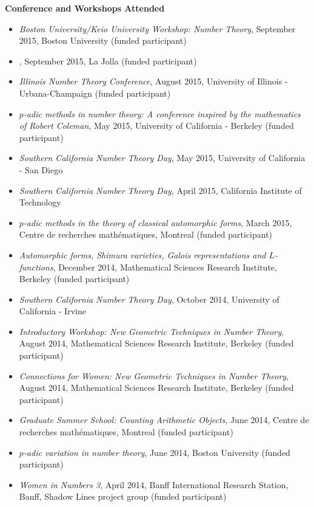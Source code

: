 \documentclass[10pt]{article}
\theoremstyle{plain} \numberwithin{equation}{section}
\theoremstyle{definition}
\begin{document}
\bigskip

{\large\textbf{Conference and Workshops Attended}}

\begin{itemize} 
\item[] \textit{Boston University/Keio University Workshop: Number Theory}, September 2015, Boston University (funded participant)
\item[] , September 2015, La Jolla (funded participant)
\item[] \textit{Illinois Number Theory Conference}, August 2015, University of Illinois - Urbana-Champaign (funded participant)
\item[] \textit{$p$-adic methods in number theory: A conference inspired by the mathematics of Robert Coleman}, May 2015, University of California - Berkeley (funded participant)
\item[] \textit{Southern California Number Theory Day}, May 2015, University of California - San Diego
\item[] \textit{Southern California Number Theory Day}, April 2015, California Institute of Technology
\item[] \textit{$p$-adic methods in the theory of classical automorphic forms}, March 2015, Centre de recherches math\'ematiques, Montreal (funded participant)
\item[] \textit{Automorphic forms, Shimura varieties, Galois representations and $L$-functions}, December 2014, Mathematical Sciences Research Institute, Berkeley (funded participant)
\item[] \textit{Southern California Number Theory Day}, October 2014, University of California - Irvine
\item[] \textit{Introductory Workshop: New Geometric Techniques in Number Theory}, August 2014, Mathematical Sciences Research Institute, Berkeley (funded participant)
\item[] \textit{Connections for Women: New Geometric Techniques in Number Theory}, August 2014, Mathematical Sciences Research Institute, Berkeley (funded participant)
\item[] \textit{Graduate Summer School: Counting Arithmetic Objects}, June 2014, Centre de recherches math\'ematiques, Montreal (funded participant)
\item[] \textit{$p$-adic variation in number theory}, June 2014, Boston University (funded participant)
\item[] \textit{Women in Numbers 3}, April 2014, Banff International Research Station, Banff, Shadow Lines project group (funded participant)

\end{itemize}
\end{document}
